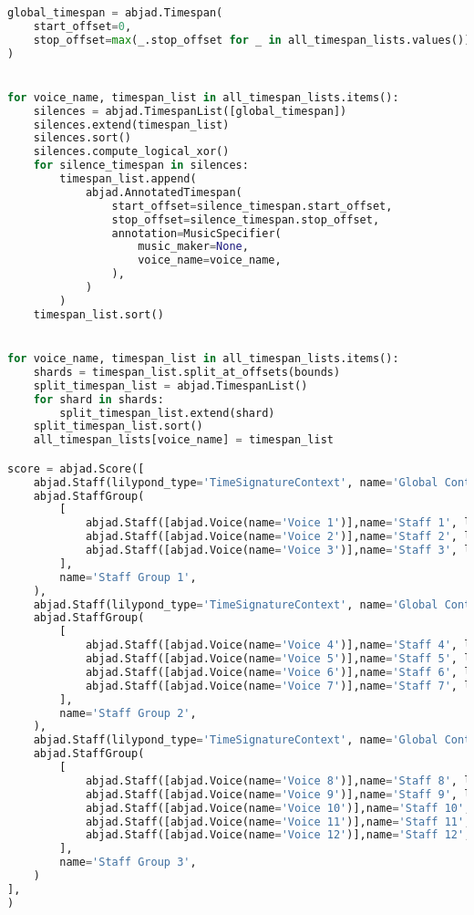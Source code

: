 \begin{lstlisting}[language=Python, caption=Tianshu Segment\_IV]
global_timespan = abjad.Timespan(
    start_offset=0,
    stop_offset=max(_.stop_offset for _ in all_timespan_lists.values())
)


for voice_name, timespan_list in all_timespan_lists.items():
    silences = abjad.TimespanList([global_timespan])
    silences.extend(timespan_list)
    silences.sort()
    silences.compute_logical_xor()
    for silence_timespan in silences:
        timespan_list.append(
            abjad.AnnotatedTimespan(
                start_offset=silence_timespan.start_offset,
                stop_offset=silence_timespan.stop_offset,
                annotation=MusicSpecifier(
                    music_maker=None,
                    voice_name=voice_name,
                ),
            )
        )
    timespan_list.sort()


for voice_name, timespan_list in all_timespan_lists.items():
    shards = timespan_list.split_at_offsets(bounds)
    split_timespan_list = abjad.TimespanList()
    for shard in shards:
        split_timespan_list.extend(shard)
    split_timespan_list.sort()
    all_timespan_lists[voice_name] = timespan_list

score = abjad.Score([
    abjad.Staff(lilypond_type='TimeSignatureContext', name='Global Context 1'),
    abjad.StaffGroup(
        [
            abjad.Staff([abjad.Voice(name='Voice 1')],name='Staff 1', lilypond_type='Staff',),
            abjad.Staff([abjad.Voice(name='Voice 2')],name='Staff 2', lilypond_type='Staff',),
            abjad.Staff([abjad.Voice(name='Voice 3')],name='Staff 3', lilypond_type='Staff',),
        ],
        name='Staff Group 1',
    ),
    abjad.Staff(lilypond_type='TimeSignatureContext', name='Global Context 2'),
    abjad.StaffGroup(
        [
            abjad.Staff([abjad.Voice(name='Voice 4')],name='Staff 4', lilypond_type='Staff',),
            abjad.Staff([abjad.Voice(name='Voice 5')],name='Staff 5', lilypond_type='Staff',),
            abjad.Staff([abjad.Voice(name='Voice 6')],name='Staff 6', lilypond_type='Staff',),
            abjad.Staff([abjad.Voice(name='Voice 7')],name='Staff 7', lilypond_type='Staff',),
        ],
        name='Staff Group 2',
    ),
    abjad.Staff(lilypond_type='TimeSignatureContext', name='Global Context 3'),
    abjad.StaffGroup(
        [
            abjad.Staff([abjad.Voice(name='Voice 8')],name='Staff 8', lilypond_type='Staff',),
            abjad.Staff([abjad.Voice(name='Voice 9')],name='Staff 9', lilypond_type='Staff',),
            abjad.Staff([abjad.Voice(name='Voice 10')],name='Staff 10', lilypond_type='Staff',),
            abjad.Staff([abjad.Voice(name='Voice 11')],name='Staff 11', lilypond_type='Staff',),
            abjad.Staff([abjad.Voice(name='Voice 12')],name='Staff 12', lilypond_type='Staff',),
        ],
        name='Staff Group 3',
    )
],
)



\end{lstlisting}

